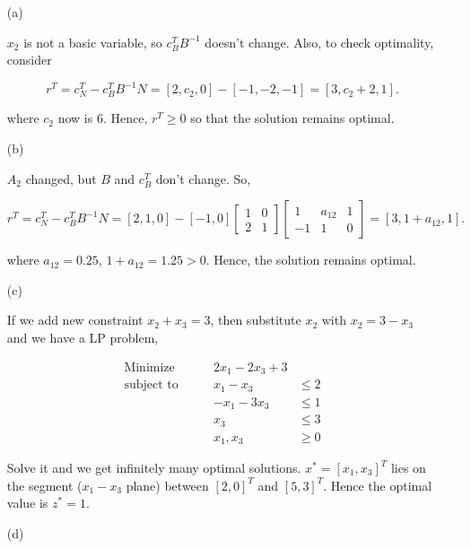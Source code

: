 \documentclass[12pt]{article}
\begin{document}
\begin{enumerate}

\item [(a)]

$x_2$ is not a basic variable, so $c_B^TB^{-1}$ doesn't change. Also, to check optimality, consider 

$$
r^T = c_N^T - c_B^TB^{-1}N = [2, c_2, 0] - [-1, -2, -1] = [3, c_2 + 2, 1]. 
$$

where $c_2$ now is $6$. Hence, $r^T \geqslant 0$ so that the solution remains optimal.

\item [(b)]

$A_2$ changed, but $B$ and $c_B^T$ don't change. So,

$$
r^T = c_N^T - c_B^TB^{-1}N = [2, 1, 0] - [-1, 0] \begin{bmatrix}
1 & 0 \\ 2 & 1
\end{bmatrix} \begin{bmatrix}
1 & a_{12} & 1 \\
-1 & 1 & 0
\end{bmatrix} = [3, 1+ a_{12}, 1]. 
$$

where $a_{12} = 0.25$, $1+ a_{12} = 1.25 >0$. Hence, the solution remains optimal.

\item [(c)]

If we add new constraint $x_2 + x_3 = 3$, then substitute $x_2$ with $x_2 = 3-x_3$ and we have a LP problem,

$$
\begin{aligned}
\text{Minimize} \qquad & 2x_1  - 2x_3 + 3 &  \\
\text{subject\  to} \qquad & x_1 - x_3 & \leqslant 2\\
 & -x_1 - 3x_3 & \leqslant 1 \\
 & x_3 & \leqslant 3 \\
 & x_1, x_3 & \geqslant 0
\end{aligned}
$$ 

Solve it and we get infinitely many optimal solutions. $x^* = [x_1, x_3]^T$ lies on the segment ($x_1-x_3$ plane) between $[2, 0]^T$ and $[5,3]^T$. Hence the optimal value is $z^* = 1$.

\item [(d)]




\end{enumerate}
\end{document}
